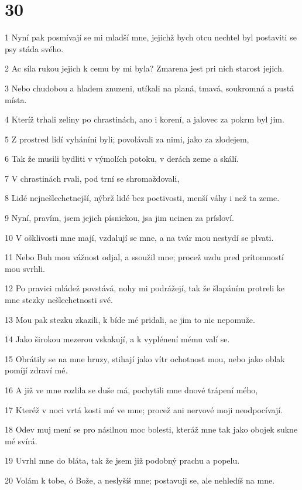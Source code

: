 \chapter{30}

\par 1 Nyní pak posmívají se mi mladší mne, jejichž bych otcu nechtel byl postaviti se psy stáda svého.
\par 2 Ac síla rukou jejich k cemu by mi byla? Zmarena jest pri nich starost jejich.
\par 3 Nebo chudobou a hladem znuzeni, utíkali na planá, tmavá, soukromná a pustá místa.
\par 4 Kteríž trhali zeliny po chrastinách, ano i korení, a jalovec za pokrm byl jim.
\par 5 Z prostred lidí vyháníni byli; povolávali za nimi, jako za zlodejem,
\par 6 Tak že musili bydliti v výmolích potoku, v derách zeme a skálí.
\par 7 V chrastinách rvali, pod trní se shromaždovali,
\par 8 Lidé nejnešlechetnejší, nýbrž lidé bez poctivosti, menší váhy i než ta zeme.
\par 9 Nyní, pravím, jsem jejich písnickou, jsa jim ucinen za prísloví.
\par 10 V ošklivosti mne mají, vzdalují se mne, a na tvár mou nestydí se plvati.
\par 11 Nebo Buh mou vážnost odjal, a ssoužil mne; procež uzdu pred prítomností mou svrhli.
\par 12 Po pravici mládež povstává, nohy mi podrážejí, tak že šlapáním protreli ke mne stezky nešlechetnosti své.
\par 13 Mou pak stezku zkazili, k bíde mé pridali, ac jim to nic nepomuže.
\par 14 Jako širokou mezerou vskakují, a k vyplénení mému valí se.
\par 15 Obrátily se na mne hruzy, stihají jako vítr ochotnost mou, nebo jako oblak pomíjí zdraví mé.
\par 16 A již ve mne rozlila se duše má, pochytili mne dnové trápení mého,
\par 17 Kteréž v noci vrtá kosti mé ve mne; procež ani nervové moji neodpocívají.
\par 18 Odev muj mení se pro násilnou moc bolesti, kteráž mne tak jako obojek sukne mé svírá.
\par 19 Uvrhl mne do bláta, tak že jsem již podobný prachu a popelu.
\par 20 Volám k tobe, ó Bože, a neslyšíš mne; postavuji se, ale nehledíš na mne.
